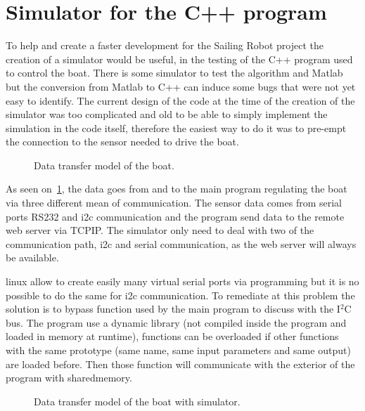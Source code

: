 \section{Simulator for the C++ program} \label{sec:simulator}

To help and create a faster development for the Sailing Robot project the creation of a simulator would be useful, in the testing of the \gls{C++} program used to control the boat. 
There is some simulator to test the algorithm and Matlab but the conversion from Matlab to C++ can induce some bugs that were not yet easy to identify.
The current design of the code at the time of the creation of the simulator was too complicated and old to be able to simply implement the simulation in the code itself, therefore the easiest way to do it was to pre-empt the connection to the sensor needed to drive the boat.

\begin{figure}[H]
\centering
{} %
{

}
\caption{Data transfer model of the boat.}
\label{fig:model_boat_com}
\end{figure}

As seen on~\ref{fig:model_boat_com}, the data goes from and to the main program regulating the boat via three different mean of communication.
The sensor data comes from serial ports \gls{RS232} and \gls{i2c} communication and the program send data to the remote web server via \gls{TCPIP}. The simulator only need to deal with two of the communication path, \gls{i2c} and serial communication, as the web server will always be available. 

\gls{linux} allow to create easily many virtual serial ports via programming but it is no possible to do the same for \gls{i2c} communication. To remediate at this problem the solution is to bypass function used by the main program to discuss with the I$^2$C bus. The program use a dynamic library (not compiled inside the program  and loaded in memory at runtime), functions can be overloaded if other functions with the same prototype (same name, same input parameters and same output) are loaded before. Then those function will communicate with the exterior of the program  with \gls{sharedmemory}.

\begin{figure}[H]
\centering
{} %
{

}
\caption{Data transfer model of the boat with simulator.}
\label{fig:model_boat_sim}
\end{figure}

